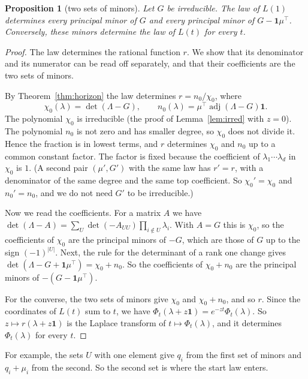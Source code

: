 \documentclass[11pt]{article}
\newtheorem{proposition}[theorem]{Proposition}
\theoremstyle{definition}
\theoremstyle{remark}
\newcommand{\one}{\mathbf 1}
\begin{document}
\begin{proposition}[two sets of minors]\label{prop:minors}
Let $G$ be irreducible. The law of $L(1)$ determines every principal minor of
$G$ and every principal minor of $G-\one\mu^{\top}$. Conversely, these minors
determine the law of $L(t)$ for every $t$.
\end{proposition}
\begin{proof}
The law determines the rational function $r$. We show that its denominator
and its numerator can be read off separately, and that their coefficients are
the two sets of minors.

By Theorem~\ref{thm:horizon} the law determines $r=n_0/\chi_0$, where
\[
\chi_0(\lambda)=\det(\Lambda-G),\qquad
n_0(\lambda)=\mu^{\top}\operatorname{adj}(\Lambda-G)\one .
\]
The polynomial $\chi_0$ is irreducible (the proof of Lemma~\ref{lem:irred} with
$z=0$). The polynomial $n_0$ is not zero and has smaller degree, so $\chi_0$
does not divide it. Hence the fraction is in lowest terms, and $r$ determines
$\chi_0$ and $n_0$ up to a common constant factor. The factor is fixed because
the coefficient of $\lambda_1\cdots\lambda_d$ in $\chi_0$ is $1$. (A second
pair $(\mu',G')$ with the same law has $r'=r$, with a denominator of the same
degree and the same top coefficient. So $\chi_0'=\chi_0$ and $n_0'=n_0$, and we
do not need $G'$ to be irreducible.)

Now we read the coefficients. For a matrix $A$ we have
$\det(\Lambda-A)=\sum_{U}\det(-A_{UU})\prod_{i\notin U}\lambda_i$. With $A=G$
this is $\chi_0$, so the coefficients of $\chi_0$ are the principal minors of
$-G$, which are those of $G$ up to the sign $(-1)^{|U|}$. Next, the rule for
the determinant of a rank one change gives
$\det(\Lambda-G+\one\mu^{\top})=\chi_0+n_0$. So the coefficients of
$\chi_0+n_0$ are the principal minors of $-(G-\one\mu^{\top})$.

For the converse, the two sets of minors give $\chi_0$ and $\chi_0+n_0$, and so
$r$. Since the coordinates of $L(t)$ sum to $t$, we have
$\Phi_t(\lambda+z\one)=e^{-zt}\Phi_t(\lambda)$. So $z\mapsto r(\lambda+z\one)$
is the Laplace transform of $t\mapsto\Phi_t(\lambda)$, and it determines
$\Phi_t(\lambda)$ for every $t$.
\end{proof}

For example, the sets $U$ with one element give $q_i$ from the first set of
minors and $q_i+\mu_i$ from the second. So the second set is where the start
law enters.
\end{document}

